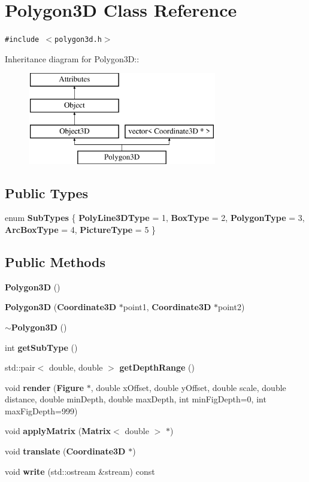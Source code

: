 \section{Polygon3D Class Reference}
\label{classPolygon3D}
{\tt \#include $<$polygon3d.h$>$}

Inheritance diagram for Polygon3D::\begin{figure}[H]
\begin{center}
\leavevmode
\includegraphics[height=4cm]{classPolygon3D}
\end{center}
\end{figure}
\subsection*{Public Types}
\begin{CompactItemize}
\item 
enum {\bf Sub\-Types} \{ {\bf Poly\-Line3DType} =   1, 
{\bf Box\-Type} =  2, 
{\bf Polygon\-Type} =  3, 
{\bf Arc\-Box\-Type} =  4, 
{\bf Picture\-Type} =  5
 \}
\end{CompactItemize}
\subsection*{Public Methods}
\begin{CompactItemize}
\item 
{\bf Polygon3D} ()
\item 
{\bf Polygon3D} ({\bf Coordinate3D} $\ast$point1, {\bf Coordinate3D} $\ast$point2)
\item 
{\bf $\sim$Polygon3D} ()
\item 
int {\bf get\-Sub\-Type} ()
\item 
std::pair$<$ double, double $>$ {\bf get\-Depth\-Range} ()
\item 
void {\bf render} ({\bf Figure} $\ast$, double x\-Offset, double y\-Offset, double scale, double distance, double min\-Depth, double max\-Depth, int min\-Fig\-Depth=0, int max\-Fig\-Depth=999)
\item 
void {\bf apply\-Matrix} ({\bf Matrix}$<$ double $>$ $\ast$)
\item 
void {\bf translate} ({\bf Coordinate3D} $\ast$)
\item 
void {\bf write} (std::ostream \&stream) const
\end{CompactItemize}
